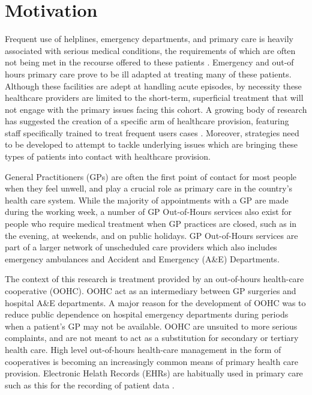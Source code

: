  


\section{Motivation}

Frequent use of helplines, emergency departments, and primary care is heavily associated with serious medical conditions, the requirements of which are often not being met in the recourse offered to these patients \cite{daniels2018better}.  Emergency and out-of hours primary care prove to be ill adapted at treating many of these patients. Although these facilities are adept at handling acute episodes, by necessity these healthcare providers are limited to the short-term, superficial treatment that will not engage with the primary issues facing this cohort.  A growing body of research has suggested the creation of a specific arm of healthcare provision, featuring staff specifically trained to treat frequent users cases \cite{malins2016cognitive,buja2015determines}. Moreover, strategies need to be developed to attempt to tackle underlying issues which are bringing these types of patients into contact with healthcare provision. 

General Practitioners (GPs) are often the first point of contact for most people when they feel unwell, and play a crucial role as primary care in the country’s health care system. While the majority of appointments with a GP are made during the working week, a number of GP Out-of-Hours services also exist for people who require medical treatment when GP practices are closed, such as in the evening, at weekends, and on public holidays. GP Out-of-Hours services are part of a larger network of unscheduled care providers which also includes emergency ambulances and Accident and Emergency (A\&E) Departments. 

 
 The context of this research is treatment provided by an out-of-hours health-care cooperative (OOHC). OOHC  act as an intermediary between GP surgeries and hospital A\&E departments. A major reason for the development of OOHC was to reduce public dependence on hospital emergency departments during periods when a patient's GP may not be available. OOHC are unsuited to more serious complaints, and are not meant to act as a substitution for secondary or tertiary health care. High level out-of-hours health-care management in the form of cooperatives is becoming  an increasingly common means of primary health care provision. Electronic Helath Records (EHRs) are habitually used in primary care such as this for the recording of patient data \cite{michiels2017influenza}.

